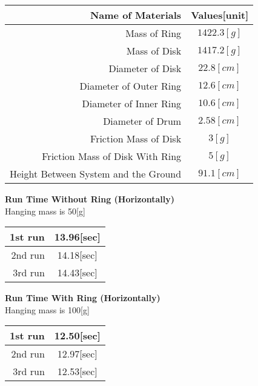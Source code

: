 \documentclass[12pt,letterpaper,fleqn]{article}
\begin{document}
\begin{table}[htb]
\begin{center}
	\begin{tabular}{|r||c||}\hline
	Name of Materials & Values[unit]\\\hline\hline
    Mass of Ring & $1422.3[g]$\\\hline
    Mass of Disk & $ 1417.2[g]$ \\\hline\hline
    Diameter of Disk  &$22.8[cm] $\\\hline
    Diameter of Outer Ring & $12.6[cm]$ \\\hline
    Diameter of Inner Ring &$10.6[cm] $   \\\hline 
    Diameter of Drum & $2.58[cm] $\\\hline\hline
    Friction Mass of Disk & $3[g]$\\\hline
    Friction Mass of Disk With Ring & $5[g]$\\\hline\hline
    Height Between System and the Ground & $91.1[cm]$\\\hline
    \end{tabular}
\end{center}
\end{table}
\newpage
\begin{center}
{\large\bf Run Time Without Ring (Horizontally)}
\\ Hanging mass is 50[g]
\end{center}

\begin{table}[htb]
\begin{center}
\begin{tabular}{|r||c|}\hline
	1st run & 13.96[sec]\\\hline 
	2nd run & 14.18[sec]\\\hline
	3rd run &14.43[sec]\\\hline
\end{tabular}
\end{center}
\end{table}

\begin{center}
{\large\bf Run Time With Ring (Horizontally)}
\\ Hanging mass is 100[g]
\end{center}

\begin{table}[htb]
\begin{center}
\begin{tabular}{|r||c|}\hline
	1st run & 12.50[sec]\\\hline 
	2nd run & 12.97[sec]\\\hline
	3rd run & 12.53[sec]\\\hline
\end{tabular}
\end{center}
\end{table}
\end{document}
